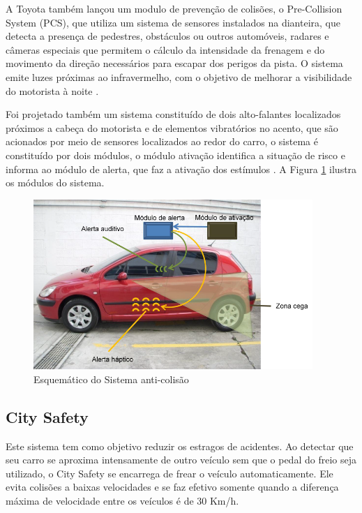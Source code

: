  A Toyota também lançou um modulo de prevenção de colisões, o Pre-Collision System (PCS), que utiliza um sistema de sensores instalados na
 dianteira, que detecta a presença de pedestres, obstáculos ou outros automóveis, radares e câmeras especiais que permitem o cálculo da intensidade
  da frenagem e do movimento da direção necessários para escapar dos perigos da pista. O sistema emite luzes próximas ao infravermelho, com o
  objetivo de melhorar a visibilidade do motorista à noite \cite{toyota}.

 Foi projetado também um sistema constituído de dois alto-falantes localizados próximos a cabeça do motorista e de elementos vibratórios no
 acento, que são acionados por meio de sensores localizados ao redor do carro, o sistema é constituído por dois módulos, o módulo ativação
 identifica a situação de risco e informa ao módulo de alerta, que faz a ativação dos estímulos \cite{usp}. A Figura \ref{fig:sistemaanticolisao} ilustra os módulos do sistema.


  \begin{figure}[h]
    \centering
    \includegraphics[width=400px, scale=0.5]{figuras/sistemaanticolisao}
    \caption{Esquemático do Sistema anti-colisão}
    \label{fig:sistemaanticolisao}
  \end{figure}

\subsection{City Safety}
Este sistema tem como objetivo reduzir os estragos de acidentes. Ao detectar que seu carro se aproxima intensamente de outro veículo sem que o pedal do freio seja utilizado, o City Safety se encarrega de frear o veículo automaticamente. Ele evita colisões a baixas velocidades e se faz efetivo somente quando a diferença máxima de velocidade entre os veículos é de 30 Km/h.

